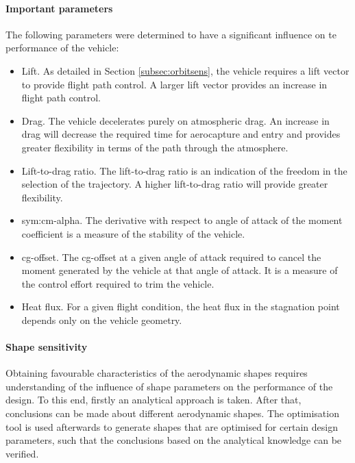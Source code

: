 


\paragraph{Important parameters}\label{sec:aeroparams}
 The following parameters were determined to have a significant influence on te performance of the vehicle:

\begin{itemize}
	\item{Lift. As detailed in Section \ref{subsec:orbitsens}, the vehicle requires a lift vector to provide flight path control. A larger lift vector provides an increase in flight path control.}
	\item{Drag. The vehicle decelerates purely on atmospheric drag. An increase in drag will decrease the required time for aerocapture and entry and provides greater flexibility in terms of the path through the atmosphere.}
	\item{Lift-to-drag ratio. The lift-to-drag ratio is an indication of the freedom in the selection of the trajectory. A higher lift-to-drag ratio will provide greater flexibility.}
	\item{\gls{sym:cm-alpha}. The derivative with respect to angle of attack of the moment coefficient is a measure of the stability of the vehicle. }
	\item{\gls{cg}-offset}. The \gls{cg}-offset at a given angle of attack required to cancel the moment generated by the vehicle at that angle of attack. It is a measure of the control effort required to trim the vehicle. 
	\item{Heat flux. For a given flight condition, the heat flux in the stagnation point depends only on the vehicle geometry.  }
\end{itemize}


\paragraph{Shape sensitivity} \label{sec:aerooptima}
Obtaining favourable characteristics of the aerodynamic shapes requires understanding of the influence of shape parameters on the performance of the design. To this end, firstly an analytical approach is taken. After that, conclusions can be made about different aerodynamic shapes. The optimisation tool is used afterwards to generate shapes that are optimised for certain design parameters, such that the conclusions based on the analytical knowledge can be verified.

